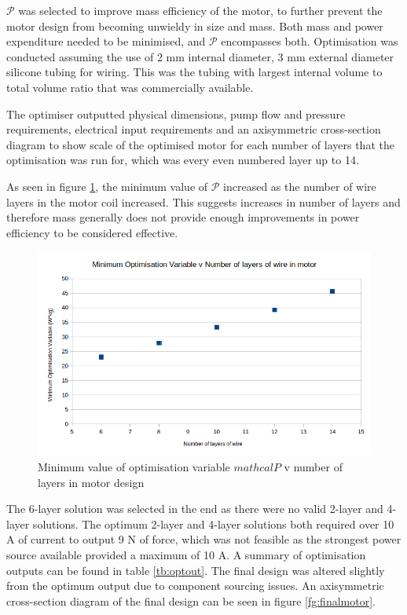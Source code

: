 \documentclass[a4paper,12pt]{article}
\begin{document}
$\mathcal{P}$ was selected to improve mass efficiency of the motor, to further prevent the motor design from becoming unwieldy in size and mass. Both mass and power expenditure needed to be minimised, and $\mathcal{P}$ encompasses both. Optimisation was conducted assuming the use of 2 mm internal diameter, 3 mm external diameter silicone tubing for wiring. This was the tubing with largest internal volume to total volume ratio that was commercially available.

The optimiser outputted physical dimensions, pump flow and pressure requirements, electrical input requirements and an axisymmetric cross-section diagram to show scale of the optimised motor for each number of layers that the optimisation was run for, which was every even numbered layer up to 14.

As seen in figure \ref{fg:optvariable}, the minimum value of $\mathcal{P}$ increased as the number of wire layers in the motor coil increased. This suggests increases in number of layers and therefore mass generally does not provide enough improvements in power efficiency to be considered effective.

\begin{figure}[h!]
    \centering
    \includegraphics[width=\textwidth]{[P]_v_layers.png}
    \caption{Minimum value of optimisation variable $mathcal{P}$ v number of layers in motor design}
    \label{fg:optvariable}
\end{figure}

The 6-layer solution was selected in the end as there were no valid 2-layer and 4-layer solutions. The optimum 2-layer and 4-layer solutions both required over 10 A of current to output 9 N of force, which was not feasible as the strongest power source available provided a maximum of 10 A. A summary of optimisation outputs can be found in table \ref{tb:optout}. The final design was altered slightly from the optimum output due to component sourcing issues. An axisymmetric cross-section diagram of the final design can be seen in figure \ref{fg:finalmotor}.
\end{document}
